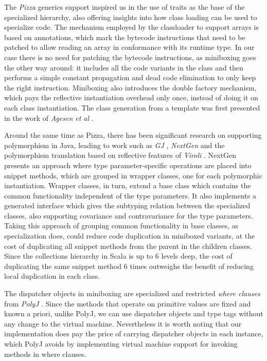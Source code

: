 The {\em Pizza} generics support \cite{pizza} inspired us in the use of traits as the base of the specialized hierarchy, also offering insights into how class loading can be used to specialize code. The mechanism employed by the classloader to support arrays is based on annotations, which mark the bytecode instructions that need to be patched to allow reading an array in conformance with its runtime type. In our case there is no need for patching the bytecode instructions, as miniboxing goes the other way around: it includes all the code variants in the class and then performs a simple constant propagation and dead code elimination to only keep the right instruction. Miniboxing also introduces the double factory mechanism, which pays the reflective instantiation overhead only once, instead of doing it on each class instantiation. The class generation from a template was first presented in the work of {\em Agesen et al} \cite{agesen-classloading}. 

Around the same time as Pizza, there has been significant research on supporting polymorphism in Java, leading to work such as {\em GJ} \cite{java-erasure}, {\em NextGen} \cite{cartwright-nextgen} and the polymorphism translation based on reflective features of {\em Viroli} \cite{viroli-reflective}. NextGen \cite{cartwright-nextgen, allen-mixins, sasitorn-nextgen} presents an approach where type parameter-specific operations are placed into snippet methods, which are grouped in wrapper classes, one for each polymorphic instantiation. Wrapper classes, in turn, extend a base class which contains the common functionality independent of the type parameters. It also implements a generated interface which gives the subtyping relation between the specialized classes, also supporting covariance and contravariance for the type parameters. Taking this approach of grouping common functionality in base classes, as specialization does, could reduce code duplication in miniboxed variants, at the cost of duplicating all snippet methods from the parent in the children classes. Since the collections hierarchy in Scala is up to 6 levels deep, the cost of duplicating the same snippet method 6 times outweighs the benefit of reducing local duplication in each class. 

The dispatcher objects in miniboxing are specialized and restricted {\em where clauses} from {\em PolyJ} \cite{myers-polyj}. Since the methods that operate on primitive values are fixed and known a priori, unlike PolyJ, we can use dispatcher objects and type tags without any change to the virtual machine. Nevertheless it is worth noting that our implementation does pay the price of carrying dispatcher objects in each instance, which PolyJ avoids by implementing virtual machine support for invoking methods in where clauses.

